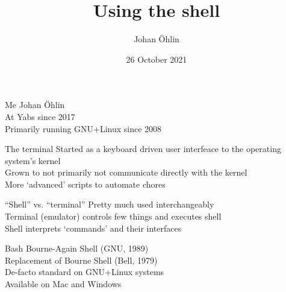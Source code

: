 \documentclass{beamer}
\title{Using the shell}
\date{26 October 2021}
\author{Johan Öhlin}
\institute{Yabs}
\begin{document}
\maketitle

\begin{frame}{Me}
        Johan Öhlin           \\
        At Yabs since 2017    \\
        Primarily running GNU+Linux since 2008    \\
\end{frame}
\begin{frame}{The terminal}
        Started as a keyboard driven user interfeace to the operating system's
        kernel                                                            \\
        Grown to not primarily not communicate directly with the kernel   \\
        More `advanced' scripts to automate chores                        \\
\end{frame}

\begin{frame}{``Shell'' vs. ``terminal''}
        Pretty much used interchangeably                                  \\
        Terminal (emulator) controls few things and executes shell        \\
        Shell interprets `commands' and their interfaces                  \\
\end{frame}

\begin{frame}{Bash}
        Bourne-Again Shell (GNU, 1989)                                    \\
        Replacement of Bourne Shell (Bell, 1979)                          \\
        De-facto standard on GNU+Linux systems                            \\
        Available on Mac and Windows                                      \\
\end{frame}
\end{document}
